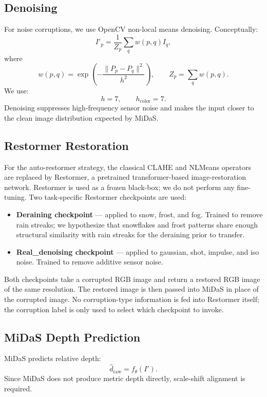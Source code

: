 \documentclass[10pt]{article}
\begin{document}
\subsection{Denoising}

For noise corruptions, we use OpenCV non-local means denoising. Conceptually:
\[
I'_p =
\frac{1}{Z_p}
\sum_q
w(p,q)I_q,
\]
where
\[
w(p,q)
=
\exp
\left(
-\frac{\|P_p-P_q\|^2}{h^2}
\right),
\qquad
Z_p = \sum_q w(p,q).
\]
We use:
\[
h=7,
\qquad
h_{\text{color}}=7.
\]
Denoising suppresses high-frequency sensor noise and makes the input closer to the clean image distribution expected by MiDaS.

\subsection{Restormer Restoration}

For the auto-restormer strategy, the classical CLAHE and NLMeans operators are replaced by Restormer, a pretrained transformer-based image-restoration network. Restormer is used as a frozen black-box; we do not perform any fine-tuning. Two task-specific Restormer checkpoints are used:

\begin{itemize}[leftmargin=*]
    \item \textbf{Deraining checkpoint} — applied to snow, frost, and fog. Trained to remove rain streaks; we hypothesize that snowflakes and frost patterns share enough structural similarity with rain streaks for the deraining prior to transfer.
    \item \textbf{Real\_denoising checkpoint} — applied to gaussian, shot, impulse, and iso noise. Trained to remove additive sensor noise.
\end{itemize}

Both checkpoints take a corrupted RGB image and return a restored RGB image of the same resolution. The restored image is then passed into MiDaS in place of the corrupted image. No corruption-type information is fed into Restormer itself; the corruption label is only used to select which checkpoint to invoke.

\subsection{MiDaS Depth Prediction}

MiDaS predicts relative depth:
\[
\hat d_{\text{raw}} = f_\theta(I').
\]
Since MiDaS does not produce metric depth directly, scale-shift alignment is required.
\end{document}
